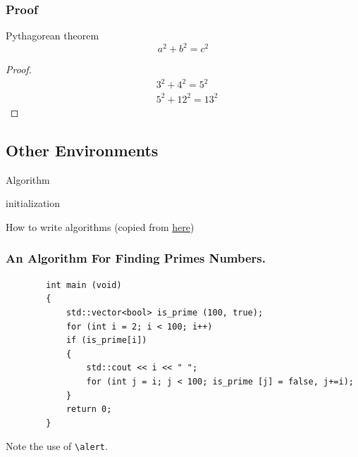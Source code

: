 \begin{frame}
    \frametitle{Proof}

    \begin{block}{Pythagorean theorem}
        \vspace*{-\baselineskip}\setlength\belowdisplayshortskip{0.1pt}
        $$a^2 + b^2 = c^2$$
    \end{block}
    
    \vspace{0.4cm}

    \begin{proof}
        \vspace*{-\baselineskip}\setlength\belowdisplayshortskip{0pt}
        \begin{align*}
            &3^2 + 4^2 = 5^2\\
            &5^2 + 12^2 = 13^2
        \end{align*}
    \end{proof}
    
\end{frame}

\subsection{Other Environments}

\begin{frame}{Algorithm}
    \scriptsize
    \begin{algorithm}[H]
        initialization\;
        \caption{How to write algorithms
        (copied from \href{https://en.wikibooks.org/wiki/LaTeX/Algorithms}{here})}
        \end{algorithm}
\end{frame}

\begin{frame}[fragile]
    \frametitle{An Algorithm For Finding Primes Numbers.}
    \scriptsize
    \begin{verbatim}
        int main (void)
        {
            std::vector<bool> is_prime (100, true);
            for (int i = 2; i < 100; i++)
            if (is_prime[i])
            {
                std::cout << i << " ";
                for (int j = i; j < 100; is_prime [j] = false, j+=i);
            }
            return 0;
        }
    \end{verbatim}

    \vspace{-0.7cm}

    \begin{uncoverenv}
    Note the use of \verb|\alert|.
    \end{uncoverenv}
\end{frame}


